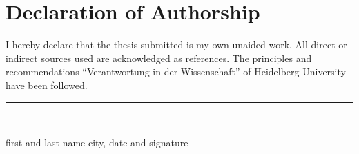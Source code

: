 
\section*{Declaration of Authorship}

I hereby declare that the thesis submitted is my own unaided work. All direct or indirect sources used are acknowledged as references. The principles and recommendations \enquote{Verantwortung in der Wissenschaft} of Heidelberg University have been followed.
\vspace{5cm}\\
\noindent\rule[0.5ex]{8em}{0.5pt} \hfill \rule[0.5ex]{10em}{0.5pt}\\
\noindent first and last name \hfill city, date and signature